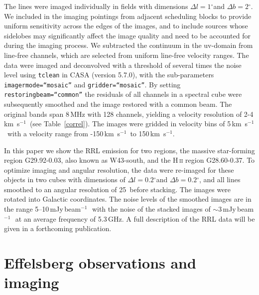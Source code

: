 \documentclass{aa}
\newcommand{\kms}{km~s$^{-1}$}
\newcommand{\degree}{$^\circ$}
\DeclareRobustCommand{\ion}[2]{\textup{#1\,\textsc{\lowercase{#2}}}}
\DeclareRobustCommand{\kms}{km\,${\rm s}^{-1}$}
\DeclareRobustCommand{\jyb}{Jy\,beam${}^{-1}$\,}
\begin{document}
The lines were imaged individually in fields with dimensions $\Delta l = 1$\degree and $\Delta b = 2$\degree. We included in the imaging pointings from adjacent scheduling blocks to provide uniform sensitivity across the edges of the images, and to include sources whose sidelobes may significantly affect the image quality and need to be accounted for during the imaging process. We subtracted the continuum in the uv-domain from line-free channels, which are selected from uniform line-free velocity ranges. The data were imaged and deconvolved with a threshold of several times the noise level using \texttt{tclean} in CASA (version 5.7.0), with the sub-parameters {\tt imagermode=``mosaic''} and {\tt gridder=``mosaic''}. By setting {\tt restoringbeam=``common''} the residuals of all channels in a spectral cube were subsequently smoothed and the image restored with a common beam. The original bands span 8\,MHz with 128 channels, yielding a velocity resolution of 2-4\,\kms\ (see Table~\ref{correl}). The images were gridded in velocity bins of 5\,\kms\ with a velocity range from -150\,\kms\ to 150\,\kms.

In this paper we show the RRL emission for two regions, the massive star-forming region G29.92-0.03, also known as W43-south, and  the \ion{H}{ii} region G28.60-0.37. To optimize imaging and angular resolution, the data were re-imaged for these objects in two cubes with dimensions of $\Delta l = 0.2$\degree and $\Delta b = 0.2$\degree, and all lines smoothed to an angular resolution of 25\arcsec\ before stacking. The images were rotated into Galactic coordinates. The noise levels of the smoothed images are in the  range   5--10\,m\jyb\, with the noise of the stacked images of $\sim3$\,m\jyb\ at an average frequency of 5.3\,GHz. A full description of the RRL data will be given in a forthcoming publication. 




\section{Effelsberg observations and imaging}
\end{document}
